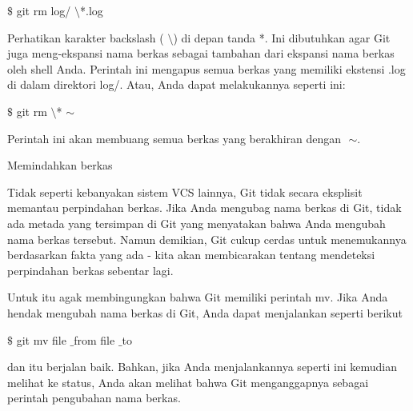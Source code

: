 \noindent 
{\fontsize{14pt}{14pt}\selectfont  $  \$  $ git rm log/ $  \setminus  $*.log \\} \par
\noindent 
{\fontsize{14pt}{14pt}\selectfont Perhatikan karakter backslash ( $  \setminus  $) di depan tanda $  $*. Ini dibutuhkan agar Git juga meng-ekspansi nama berkas sebagai tambahan dari ekspansi nama berkas oleh shell Anda. Perintah ini mengapus semua berkas yang memiliki ekstensi $  $.log $  $di dalam direktori $  $log/. Atau, Anda dapat melakukannya seperti ini: \\} \par
\noindent 
{\fontsize{14pt}{14pt}\selectfont  $  \$  $ git rm  $  \setminus  $* $  \sim  $ \\} \par
\noindent 
{\fontsize{14pt}{14pt}\selectfont Perintah ini akan membuang semua berkas yang berakhiran dengan $  $ $  \sim  $. \\} \par
\vspace{14pt}
\noindent 
{\fontsize{14pt}{14pt}\selectfont Memindahkan berkas \\} \par
\noindent 
{\fontsize{14pt}{14pt}\selectfont Tidak seperti kebanyakan sistem VCS lainnya, Git tidak secara eksplisit memantau perpindahan berkas. Jika Anda mengubag nama berkas di Git, tidak ada metada yang tersimpan di Git yang menyatakan bahwa Anda mengubah nama berkas tersebut. Namun demikian, Git cukup cerdas untuk menemukannya berdasarkan fakta yang ada - kita akan membicarakan tentang mendeteksi perpindahan berkas sebentar lagi. \\} \par
\noindent 
{\fontsize{14pt}{14pt}\selectfont Untuk itu agak membingungkan bahwa Git memiliki perintah $  $mv. Jika Anda hendak mengubah nama berkas di Git, Anda dapat menjalankan seperti berikut \\} \par
\vspace{14pt}
\noindent 
{\fontsize{14pt}{14pt}\selectfont  $  \$  $ git mv file $  \_  $from file $  \_  $to \\} \par
\noindent 
{\fontsize{14pt}{14pt}\selectfont dan itu berjalan baik. Bahkan, jika Anda menjalankannya seperti ini kemudian melihat ke status, Anda akan melihat bahwa Git menganggapnya sebagai perintah pengubahan nama berkas. \\} \par
